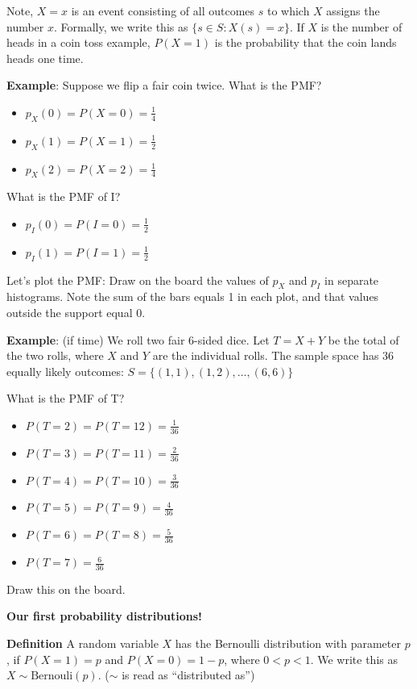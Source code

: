 \documentclass[]{article}
\begin{document}
Note, $X = x$ is an event consisting of all outcomes $s$ to which $X$ assigns the number $x$. Formally, we write this as $\{s \in S : X(s) = x\}$. If $X$ is the number of heads in a coin toss example, $P(X = 1)$ is the probability that the coin lands heads one time.

\textbf{Example}: Suppose we flip a fair coin twice. What is the PMF? 
\begin{itemize}
	\item $p_X(0) = P(X = 0) = \frac{1}{4}$ 
	\item $p_X(1) = P(X = 1) = \frac{1}{2}$ 
	\item $p_X(2) = P(X = 2) = \frac{1}{4}$ 
\end{itemize}

What is the PMF of I? 
\begin{itemize}
	\item $p_I(0) = P(I = 0) = \frac{1}{2} $
	\item $p_I(1) = P(I = 1) = \frac{1}{2} $
\end{itemize}

Let's plot the PMF: Draw on the board the values of $p_X$ and $p_I$ in separate histograms. Note the sum of the bars equals 1 in each plot, and that values outside the support equal 0.

\newpage

\textbf{Example}: (if time) We roll two fair 6-sided dice. Let $T = X + Y$ be the total of the two rolls, where $X$ and $Y$ are the individual rolls. The sample space has 36 equally likely outcomes: $S = \{(1,1), (1,2), \ldots,(6,6)\}$

What is the PMF of T? 
\begin{itemize}
	\item $P(T=2) = P(T=12) = \frac{1}{36}$ 
	\item $P(T=3) = P(T=11) = \frac{2}{36}$
	\item $P(T=4) = P(T=10) = \frac{3}{36}$ 
	\item $P(T=5) = P(T=9) = \frac{4}{36}$ 
	\item $P(T=6) = P(T=8) = \frac{5}{36}$
	\item $P(T=7) = \frac{6}{36}$
\end{itemize}

Draw this on the board.

\vspace{0.25in}
\textbf{Our first probability distributions!}
\vspace{0.25in}

\textbf{Definition} A random variable $X$ has the Bernoulli distribution with parameter $p$, if $P(X = 1) = p$ and $P(X = 0) = 1 - p$, where $0 < p < 1$. We write this as $X \sim \text{Bernouli}(p)$. ($\sim$ is read as ``distributed as'')
\end{document}
